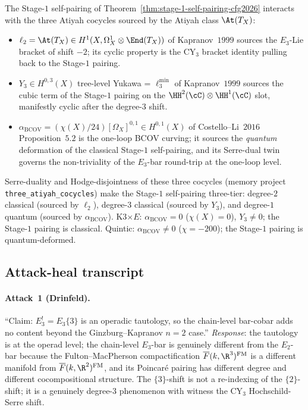 \begin{remark}
\label{rem:three-atiyah-e3-self-pairing-cfg2026}
The Stage-$1$ self-pairing of
Theorem~\textup{\ref{thm:stage-1-self-pairing-cfg2026}} interacts with
the three Atiyah cocycles sourced by the Atiyah class $\At(T_X)$:
\begin{itemize}
  \item $\ell_2 = \At(T_X) \in H^1(X, \Omega^1_X \otimes \End(T_X))$ of
        Kapranov~$1999$ sources the $E_3$-Lie bracket of shift $-2$; its
        cyclic property is the CY$_3$ bracket identity pulling back to
        the Stage-$1$ pairing.
  \item $Y_3 \in H^{0, 3}(X)$ tree-level Yukawa = $\ell_3^{\min}$ of
        Kapranov~$1999$ sources the cubic term of the Stage-$1$ pairing
        on the $\HH^2(\cC) \otimes \HH^1(\cC)$ slot, manifestly
        cyclic after the degree-$3$ shift.
  \item $\alpha_{\mathrm{BCOV}} = (\chi(X)/24) [\Omega_X]^{0, 1} \in H^{0, 1}(X)$
        of Costello--Li~$2016$ Proposition~$5.2$ is the one-loop BCOV
        curving; it sources the \emph{quantum} deformation of the
        classical Stage-$1$ self-pairing, and its Serre-dual twin
        governs the non-triviality of the $E_3$-bar
        round-trip at the one-loop level.
\end{itemize}
Serre-duality and Hodge-disjointness of these three cocycles
(memory project \texttt{three\_atiyah\_cocycles}) make the Stage-$1$
self-pairing three-tier: degree-$2$ classical (sourced by $\ell_2$),
degree-$3$ classical (sourced by $Y_3$), and degree-$1$ quantum
(sourced by $\alpha_{\mathrm{BCOV}}$). K3$\times E$: $\alpha_{\mathrm{BCOV}} = 0$
($\chi(X) = 0$), $Y_3 \neq 0$; the Stage-$1$ pairing is classical.
Quintic: $\alpha_{\mathrm{BCOV}} \neq 0$ ($\chi = -200$); the
Stage-$1$ pairing is quantum-deformed.
\end{remark}

\subsection*{Attack-heal transcript}

\paragraph{Attack~1 (Drinfeld).}
``Claim: $E_3^! = E_3\{3\}$ is an operadic tautology, so the
chain-level bar-cobar adds no content beyond the Ginzburg--Kapranov
$n = 2$ case.'' \emph{Response}: the tautology is at the operad level;
the chain-level $E_3$-bar is genuinely different from the
$E_2$-bar because the Fulton--MacPherson compactification
$\overline{F}(k, \R^3)^{\mathrm{FM}}$ is a different manifold from
$\overline{F}(k, \R^2)^{\mathrm{FM}}$, and its Poincar\'e pairing has
different degree and different cocompositional structure. The
$\{3\}$-shift is not a re-indexing of the $\{2\}$-shift; it is a
genuinely degree-$3$ phenomenon with witness the CY$_3$ Hochschild-Serre
shift.

